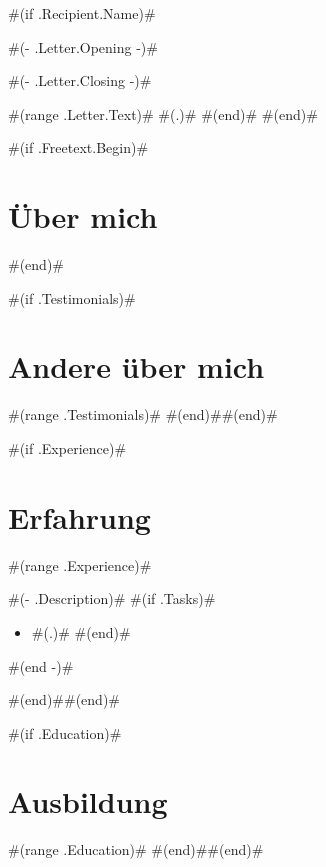 \documentclass[10pt,a4paper,sans]{moderncv}
\begin{document}
#(if .Recipient.Name)#
  \date{ #(- .Letter.Date -)# }
  \opening{ #(- .Letter.Opening -)# }
  \closing{ #(- .Letter.Closing -)# }
  \makelettertitle
  #(range .Letter.Text)#
    #(.)#
  #(end)#
  \makeletterclosing
  \pagebreak
#(end)#


\makecvtitle

#(if .Freetext.Begin)#\section{Über mich}
#(end)#

#(if .Testimonials)#\section{Andere über mich}
#(range .Testimonials)#
#(end)##(end)#

#(if .Experience)#\section{Erfahrung}
#(range .Experience)#
{ #(- .Description)# 
  #(if .Tasks)#\begin{itemize}
    #(range .Tasks)# \item #(.)#
    #(end)#\end{itemize}
  #(end -)# }
#(end)##(end)#

#(if .Education)#\section{Ausbildung}
#(range .Education)#
#(end)##(end)#
\end{document}
